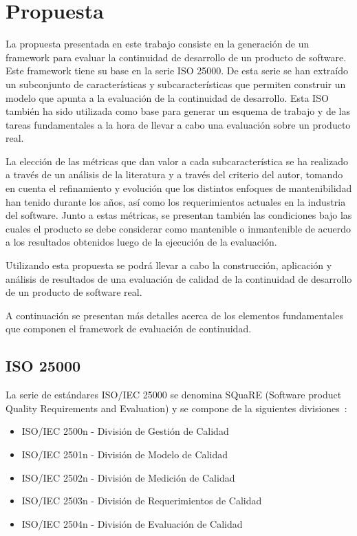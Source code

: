 \chapter{Propuesta}
\label{chap:propuesta}
La propuesta presentada en este trabajo consiste en la generación de un framework
para evaluar la continuidad de desarrollo de un producto de software. Este
framework tiene su base en la serie ISO 25000. De esta serie se han extraído un 
subconjunto de características y subcaracterísticas
que permiten construir un modelo que apunta a la evaluación de la continuidad de desarrollo.
Esta ISO también ha sido utilizada como base para generar un esquema de trabajo y de
las tareas fundamentales a la hora de llevar a cabo una evaluación sobre un producto real.

La elección de las métricas que dan valor a cada subcaracterística se ha realizado a través
de un análisis de la literatura y a través del criterio del autor,
tomando en cuenta el refinamiento y evolución que los distintos enfoques
de mantenibilidad han tenido durante los años, así como los requerimientos actuales
en la industria del software. Junto a estas métricas, se presentan también las condiciones
bajo las cuales el producto se debe considerar como mantenible o inmantenible de acuerdo
a los resultados obtenidos luego de la ejecución de la evaluación.

Utilizando esta propuesta se podrá llevar a cabo la construcción, aplicación y análisis
de resultados de una evaluación de calidad de la continuidad de desarrollo de un producto
de software real.

A continuación se presentan más detalles acerca de los elementos fundamentales que componen
el framework de evaluación de continuidad.


\section{ISO 25000}

La serie de estándares ISO/IEC 25000 se denomina SQuaRE (Software product
Quality Requirements and Evaluation) y se compone de la siguientes divisiones~\cite{25000}:

\begin{itemize}
    \item ISO/IEC 2500n - División de Gestión de Calidad
    \item ISO/IEC 2501n - División de Modelo de Calidad
    \item ISO/IEC 2502n - División de Medición de Calidad
    \item ISO/IEC 2503n - División de Requerimientos de Calidad
    \item ISO/IEC 2504n - División de Evaluación de Calidad
\end{itemize}


